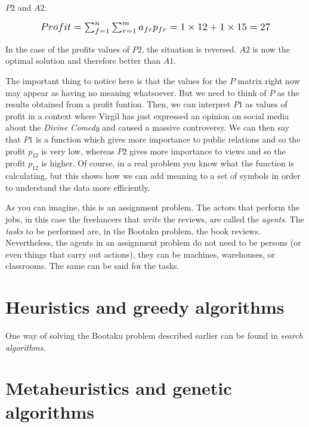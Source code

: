$P2$ and $A2$:

\begin{equation}
    \scalebox{1.2}{$Profit = \sum_{f=1}^n \sum_{r=1}^m a_{fr} p_{fr} = 1 \times 12 + 1 \times 15 = 27$}
\end{equation}

In the case of the profits values of $P2$, the situation is reversed. $A2$ is now the optimal solution and therefore better than $A1$.

The important thing to notice here is that the values for the $P$ matrix right now may appear as having no meaning whatsoever. But we need to think of $P$ as the results obtained from a profit funtion. Then, we can interpret $P1$ as values of profit in a context where Virgil has just expressed an opinion on social media about the \textit{Divine Comedy} and caused a massive controversy. We can then say that $P1$ is a function which gives more importance to public relations and so the profit $p_{12}$ is very low, whereas $P2$ gives more importance to views and so the profit $p_{12}$ is higher. Of course, in a real problem you know what the function is calculating, but this shows how we can add meaning to a set of symbols in order to understand the data more efficiently.

As you can imagine, this is an assignment problem. The actors that perform the jobs, in this case the freelancers that \textit{write} the reviews, are called the \textit{agents}. The \textit{tasks} to be performed are, in the Bootaku problem, the book reviews. Nevertheless, the agents in an assignment problem do not need to be persons (or even things that carry out actions), they can be machines, warehouses, or classrooms. The same can be said for the tasks.


\section{Heuristics and greedy algorithms}

One way of solving the Bootaku problem described earlier can be found in \textit{search algorithms}.


\section{Metaheuristics and genetic algorithms}



